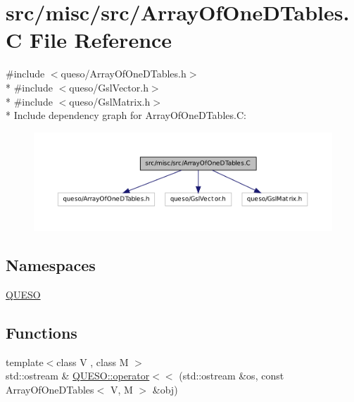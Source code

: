 \hypertarget{_array_of_one_d_tables_8_c}{\section{src/misc/src/\-Array\-Of\-One\-D\-Tables.C File Reference}
\label{_array_of_one_d_tables_8_c}
}
{\ttfamily \#include $<$queso/\-Array\-Of\-One\-D\-Tables.\-h$>$}\\*
{\ttfamily \#include $<$queso/\-Gsl\-Vector.\-h$>$}\\*
{\ttfamily \#include $<$queso/\-Gsl\-Matrix.\-h$>$}\\*
Include dependency graph for Array\-Of\-One\-D\-Tables.\-C\-:
\nopagebreak
\begin{figure}[H]
\begin{center}
\leavevmode
\includegraphics[width=350pt]{_array_of_one_d_tables_8_c__incl}
\end{center}
\end{figure}
\subsection*{Namespaces}
\begin{DoxyCompactItemize}
\item 
\hyperlink{namespace_q_u_e_s_o}{Q\-U\-E\-S\-O}
\end{DoxyCompactItemize}
\subsection*{Functions}
\begin{DoxyCompactItemize}
\item 
{\footnotesize template$<$class V , class M $>$ }\\std\-::ostream \& \hyperlink{namespace_q_u_e_s_o_a741c4181f77af64b1e82cdce4d203cfa}{Q\-U\-E\-S\-O\-::operator$<$$<$} (std\-::ostream \&os, const Array\-Of\-One\-D\-Tables$<$ V, M $>$ \&obj)
\end{DoxyCompactItemize}
